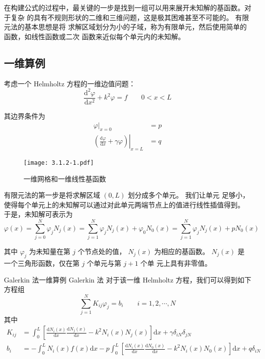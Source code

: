 \par 在构建公式的过程中，最关键的一步是找到一组可以用来展开未知解的基函数。对于复杂
的具有不规则形状的二维和三维问题，这是极其困难甚至不可能的。
有限元法的基本思想是将
求解区域划分为小的子域，称为有限单元，然后使用简单的函数，如线性函数或二次
函数来近似每个单元内的未知解。

\subsection{一维算例}

\par 考虑一个 Helmholtz 方程的一维边值问题：
\begin{equation}
    \frac{\text{d}^2\varphi}{\text{d}x^2} + k^2\varphi = f
    \qquad 0<x<L
    \label{一维Helmholtz}
\end{equation}
\par 其边界条件为
\begin{align}
    \label{一维边界条件-1}
    \left.\varphi\right|_{x=0} &= p \\
    \label{一维边界条件-2}
    \left.\left(
        \frac{\text{d}\varphi}{\text{d}x} + \gamma\varphi
    \right)\right|_{x=L} &= q
\end{align}

\begin{figure}[!htbp]
    \centering
    \texttt{[image: 3.1.2-1.pdf]}
    \caption{一维网格和一维线性基函数}
    \label{一维网格和一维线性基函数}
\end{figure}

\par 有限元法的第一步是将求解区域 $(0,L)$ 划分成多个单元。
我们让单元
足够小，使得每个单元上的未知解可以通过对此单元两端节点上的值进行线性插值得到。
于是，未知解可表示为
\begin{equation}
    \varphi(x) = \sum_{j=0}^{N} \varphi_j N_j(x)
    =\sum_{j=1}^{N} \varphi_j N_j(x)
    +\varphi_0 N_0(x)
    =\sum_{j=1}^{N} \varphi_j N_j(x)
    +p N_0(x)
    \label{一维基函数展开}
\end{equation}
\par 其中 $\varphi_j$ 为未知量在第 $j$ 个节点处的值，
$N_j(x)$ 为相应的基函数。
$N_j(x)$ 是一个三角形函数，仅在第 $j$ 个单元与第 $j+1$ 个单
元上具有非零值。

\begin{theorem}{Galerkin 法}{一维算例 Galerkin 法}
    对于该一维 Helmholtz 方程，我们可以得到如下方程组
    \begin{equation}
        \sum_{j=1}^{N} K_{ij} \varphi_j = b_i \qquad i = 1, 2, \cdots, N
    \end{equation}
    其中
    \begin{align}
        K_{ij} &= 
        \int_{0}^{L}\left[
            \frac{\text{d}N_i(x)}{\text{d}x}\frac{\text{d}N_j(x)}{\text{d}x}
            - k^2N_i(x)N_j(x)
        \right]\text{d}x+\gamma\delta_{iN}\delta_{jN}\\
        b_i &= 
        -\int_{0}^{L}N_i(x)f(x)\text{d}x
        -p\int_{0}^{L}\left[
            \frac{\text{d}N_i(x)}{\text{d}x}\frac{\text{d}N_0(x)}{\text{d}x}
            - k^2N_i(x)N_0(x)
        \right]\text{d}x+q\delta_{iN}
    \end{align}
\end{theorem}


